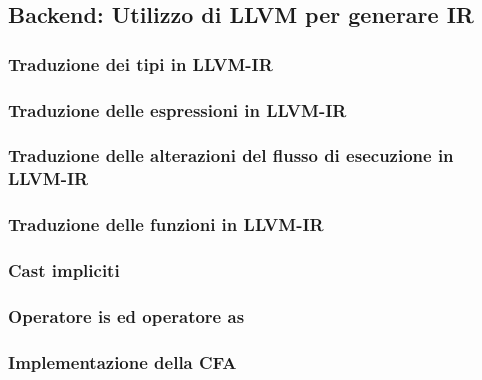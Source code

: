 \subsection{Backend: Utilizzo di LLVM per generare IR}

\subsubsection{Traduzione dei tipi in LLVM-IR}
\subsubsection{Traduzione delle espressioni in LLVM-IR}
\subsubsection{Traduzione delle alterazioni del flusso di esecuzione in LLVM-IR}
\subsubsection{Traduzione delle funzioni in LLVM-IR}
\subsubsection{Cast impliciti}
\subsubsection{Operatore is ed operatore as}
\subsubsection{Implementazione della CFA}